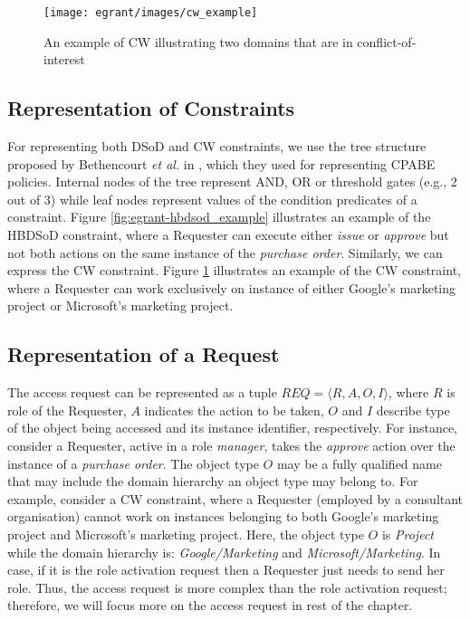 \documentclass[epsfig,a4paper,11pt,titlepage]{book}
\numberwithin{algorithm}{chapter}
\begin{document}
\begin{figure} [htp]
\centering
\texttt{[image: egrant/images/cw\_example]}
\caption[An example of Chinese Wall]{An example of \gls{CW} illustrating two domains that are in conflict-of-interest}
\label{fig:egrant-cw_example}
\end{figure}

\subsection{Representation of Constraints}
For representing both \gls{DSoD} and \gls{CW} constraints, we use the tree structure proposed by Bethencourt \emph{et al.} in \cite{Bethencourt:2007}, which they used for representing \gls{CPABE} policies. Internal nodes of the tree represent AND, OR or threshold gates (e.g., 2 out of 3) while leaf nodes represent values of the condition predicates of a constraint. Figure \ref{fig:egrant-hbdsod_example} illustrates an example of the \gls{HBDSoD} constraint, where a Requester can execute either \emph{issue} or \emph{approve} but not both actions on the same instance of the \emph{purchase order}. Similarly, we can express the \gls{CW} constraint. Figure \ref{fig:egrant-cw_example} illustrates an example of the \gls{CW} constraint, where a Requester can work exclusively on instance of either Google's marketing project or Microsoft's marketing project.

\subsection{Representation of a Request}
The access request can be represented as a tuple $\mathit{REQ} = \langle R, A, O, I \rangle$, where $R$ is role of the Requester, $A$ indicates the action to be taken, $O$ and $I$ describe type of the object being accessed and its instance identifier, respectively. For instance, consider a Requester, active in a role \emph{manager}, takes the \emph{approve} action over the instance of a \emph{purchase order}. The object type $O$ may be a fully qualified name that may include the domain hierarchy an object type may belong to. For example, consider a \gls{CW} constraint, where a Requester (employed by a consultant organisation) cannot work on instances belonging to both Google's marketing project and Microsoft's marketing project. Here, the object type $O$ is \emph{Project} while the domain hierarchy is: \emph{Google/Marketing} and \emph{Microsoft/Marketing}. In case, if it is the role activation request then a Requester just needs to send her role. Thus, the access request is more complex than the role activation request; therefore, we will focus more on the access request in rest of the chapter.
\end{document}
